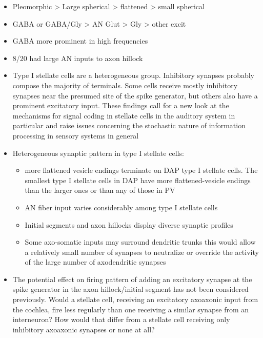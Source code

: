 \documentclass[10pt,a4paper]{article}
\begin{document}
\begin{itemize}
\item Pleomorphic {\textgreater} Large spherical {\textgreater} flattened
  {\textgreater} small spherical
\item GABA or GABA/Gly {\textgreater} AN Glut {\textgreater} Gly {\textgreater}
  other excit
\item GABA more prominent in high frequencies
\item 8/20 had large AN inputs to axon hillock
\item Type I stellate cells are a heterogeneous group. Inhibitory synapses
  probably compose the majority of terminals. Some cells receive mostly
  inhibitory synapses near the presumed site of the spike generator, but others
  also have a prominent excitatory input. These findings call for a new look at
  the mechanisms for signal coding in stellate cells in the auditory system in
  particular and raise issues concerning the stochastic nature of information
  processing in sensory systems in general
\item Heterogeneous synaptic pattern in type I stellate cells:

  \begin{itemize}
  \item more flattened vesicle endings terminate on DAP type I stellate
    cells. The smallest type I stellate cells in DAP have more flattened-vesicle
    endings than the larger ones or than any of those in PV
  \item AN fiber input varies considerably among type I stellate cells
  \item Initial segments and axon hillocks display diverse synaptic profiles
  \item Some axo-somatic inputs may surround dendritic trunks this would allow a
    relatively small number of synapses to neutralize or override the activity
    of the large number of axodendritic synapses
  \end{itemize}
\item The potential effect on firing pattern of adding an excitatory synapse at
  the spike generator in the axon hillock/initial segment has not been
  considered previously. Would a stellate cell, receiving an excitatory
  axoaxonic input from the cochlea, fire less regularly than one receiving a
  similar synapse from an interneuron? How would that differ from a stellate
  cell receiving only inhibitory axoaxonic synapses or none at all?
\end{itemize}
\end{document}
